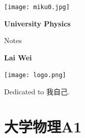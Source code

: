 \documentclass[
	12pt, %
	fleqn, %
	a4paper, %
]{myLegrandOrangeBook}
\begin{document}

\titlepage %
	{\texttt{[image: miku0.jpg]}} %
	{ %
		\centering\sffamily %
		{\Huge\bfseries University Physics\par} %
		\vspace{12pt} %
		{\LARGE Notes\par} %
		\vspace{20pt} %
		{\huge\bfseries Lai Wei\par} %
		\vspace{36pt} %
        {\texttt{[image: logo.png]}\par}
	}


    \begin{dedication}
        Dedicated to {\kaishu 我自己}.
    \end{dedication}


\pagestyle{empty} %

\tableofcontents %

\pagestyle{fancy} %

\cleardoublepage %


\part{大学物理A1}
\end{document}
